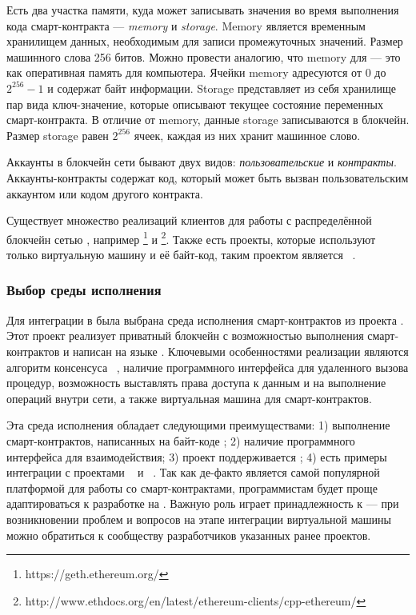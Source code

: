 Есть два участка памяти, куда  может записывать значения во время выполнения кода смарт-контракта --- \emph{memory} и \emph{storage}.
Memory является временным хранилищем данных, необходимым для записи промежуточных значений.
Размер машинного слова  256 битов.
Можно провести аналогию, что memory для  --- это как оперативная память для компьютера.
Ячейки memory адресуются от 0 до $2^{256} - 1$ и содержат байт информации.
Storage представляет из себя хранилище пар вида ключ-значение, которые описывают текущее состояние переменных смарт-контракта.
В отличие от memory, данные storage записываются в блокчейн.
Размер storage равен $2^{256}$ ячеек, каждая из них хранит машинное слово.

Аккаунты в блокчейн сети  бывают двух видов: \emph{пользовательские} и \emph{контракты}.
Аккаунты-контракты содержат код, который может быть вызван пользовательским аккаунтом или кодом другого контракта.

Существует множество реализаций клиентов для работы с распределённой блокчейн сетью , например \footnote{https://geth.ethereum.org/} и \footnote{http://www.ethdocs.org/en/latest/ethereum-clients/cpp-ethereum/}.
Также есть проекты, которые используют только виртуальную машину  и её байт-код, таким проектом является ~\cite{HLBurrow}.

\subsubsection{Выбор среды исполнения}
Для интеграции в  была выбрана среда исполнения смарт-кон\-трак\-тов из проекта .	
Этот проект реализует приватный блокчейн с возможностью выполнения смарт-кон\-трак\-тов и написан на языке .
Ключевыми особенностями реализации являются алгоритм консенсуса ~\cite{Tendermint}, наличие программного интерфейса для удаленного вызова процедур, возможность выставлять права доступа к данным и на выполнение операций внутри сети, а также виртуальная машина для смарт-контрактов.

Эта среда исполнения обладает следующими преимуществами: 1) выполнение смарт-контрактов, написанных на байт-коде ; 2) наличие программного интерфейса для взаимодействия; 3) проект поддерживается ; 4) есть примеры интеграции с проектами ~\cite{HLFabricEVM} и ~\cite{HLSeth}.
Так как  де-факто является самой популярной платформой для работы со смарт-контрактами, программистам будет проще адаптироваться к разработке на .
Важную роль играет принадлежность к  --- при возникновении проблем и вопросов на этапе интеграции виртуальной машины можно обратиться к сообществу разработчиков указанных ранее проектов.

